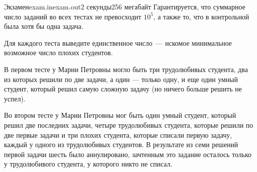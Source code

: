 \begin{problem}{Экзамен}{exam.in}{exam.out}{2 секунды}{256 мегабайт}
Гарантируется, что суммарное число 
заданий во всех тестах не превосходит $10^5$, а также то, что
в контрольной была хотя бы одна задача.

\OutputFile

Для каждого теста выведите единственное число~--- искомое минимальное 
возможное число плохих студентов.

\newpage

\Example
\begin{example}%
%
\end{example}

\Note
В первом тесте у Марии Петровны могло быть три трудолюбивых студента, два из которых решили по две задачи, а один --- только одну, и еще один
умный студент, который решил самую сложную задачу (но ничего больше решить не успел).

Во втором тесте у Марии Петровны мог быть один умный студент, который решил две последних задачи, 
четыре трудолюбивых студента, которые решили по две первые задачи и три плохих студента, которые списали первую задачу,
каждый у одного из трудолюбивых студентов. В результате из семи решений первой задачи шесть было аннулировано,
зачтенным это задание осталось только у трудолюбивого студента, у которого никто не списал.

\end{problem}
